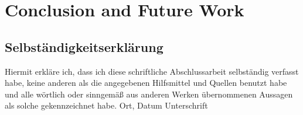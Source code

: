 \documentclass[oneside,11pt,a4paper,twoside]{scrreprt}
\begin{document}
\chapter{Conclusion and Future Work}\label{sec:conclusionandfuturework}
  
  \cleardoublepage
\printbibliography[title={References},heading=bibintoc]
\cleardoublepage
\small\normalsize
{}
\listoffigures
\small\normalsize
\cleardoublepage
\small\normalsize
{}
\listoftables
\small\normalsize
\cleardoublepage
\small\normalsize
{}
\listofalgorithms
\small\normalsize
\cleardoublepage
\printglossary[
	style=alttree,
	type=\acronymtype,
	title=List of Abbreviations,
	toctitle=List of Abbreviations
]
\cleardoublepage
\thispagestyle{empty}
\section*{Selbständigkeitserklärung}
Hiermit erkläre ich, dass ich diese schriftliche Abschlussarbeit selbständig verfasst habe, keine anderen als die angegebenen Hilfsmittel und Quellen benutzt habe und alle wörtlich oder sinngemä{\ss} aus anderen Werken übernommenen Aussagen als solche gekennzeichnet habe.
\vskip 3cm
Ort, Datum	\hfill Unterschrift \hfill
\end{document}
